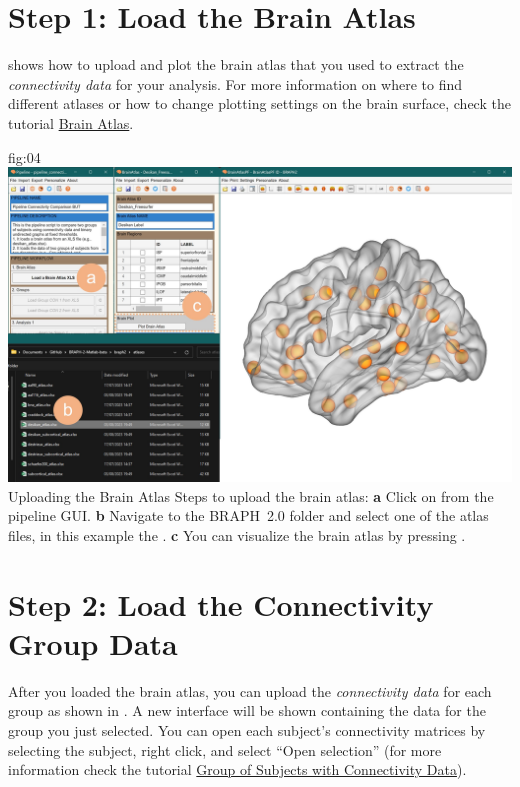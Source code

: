 \documentclass[justified]{tufte-handout}
\begin{document}
\clearpage
\section{Step 1: Load the Brain Atlas}

 shows how to upload and plot the brain atlas that you used to extract the \emph{connectivity data} for your analysis. For more information on where to find different atlases or how to change plotting settings on the brain surface, check the tutorial \href{https://github.com/braph-software/BRAPH-2/tree/develop/tutorials/general/tut_ba}{Brain Atlas}.

	{fig:04}
	{
	\includegraphics{fig04.jpg}
	}
	{Uploading the Brain Atlas}
	{
	Steps to upload the brain atlas:
	{\bf a} Click on  from the pipeline GUI.
	{\bf b} Navigate to the BRAPH~2.0 folder  and select one of the atlas files, in this example the . 
	{\bf c} You can visualize the brain atlas by pressing . 
	}
 
\clearpage
\section{Step 2: Load the Connectivity Group Data}

After you loaded the brain atlas, you can upload the \emph{connectivity data} for each group as shown in . A new interface will be shown containing the data for the group you just selected. You can open each subject’s connectivity matrices by selecting the subject, right click, and select “Open selection” (for more information check the tutorial \href{https://github.com/braph-software/BRAPH-2/tree/develop/tutorials/general/tut_gr_con}{Group of Subjects with Connectivity Data}).
\end{document}
